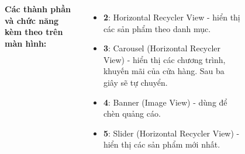 \documentclass{beamer}
\begin{document}
\begin{frame}
\begin{columns}
\begin{figure}
        \end{figure}
        \indent \textbf{Các thành phần và chức năng kèm theo trên màn hình:}
        \begin{itemize}
            \item \textbf{2}: Horizontal Recycler View - hiển thị các sản phẩm theo danh mục.
            \item \textbf{3}: Carousel (Horizontal Recycler View) - hiển thị các chương trình, khuyến mãi của cửa hàng. Sau ba giây sẽ tự chuyển.
            \item \textbf{4}: Banner (Image View) - dùng để chèn quảng cáo.
            \item \textbf{5}: Slider (Horizontal Recycler View) - hiển thị các sản phẩm mới nhất.
        \end{itemize}
    \end{columns}
\end{frame}
\end{document}
